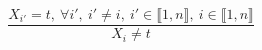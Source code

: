 $$\frac{X_{i'}=t,~\forall i',~i' \neq i,~i' \in \llbracket1,n\rrbracket,~i \in \llbracket1,n\rrbracket}{X_{i} \neq t}$$ 